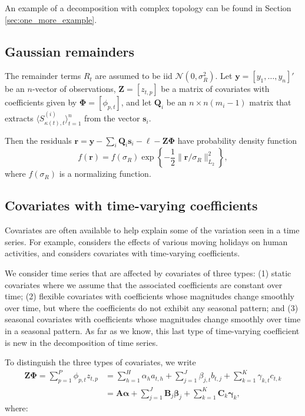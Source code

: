 \documentclass[11pt,a4paper,]{article}
\begin{document}
An example of a decomposition with complex topology can be found in Section \ref{sec:one_more_example}.

\hypertarget{gaussian-remainders}{%
\subsection{Gaussian remainders}\label{gaussian-remainders}}

The remainder terms \(R_{t}\) are assumed to be iid \(\mathcal{N}(0,\sigma_R^2)\).
Let \(\bm{y} = [y_1,\dots,y_n]'\) be an \(n\)-vector of observations, \(\bm{Z}=[z_{t,p}]\) be a matrix of covariates with coefficients given by \(\bm{\Phi} = [\phi_{p,t}]\), and let \(\bm{Q}_i\) be an \(n \times n(m_i-1)\) matrix that extracts \(\langle S^{(i)}_{\kappa(t),t} \rangle_{t=1}^{n}\) from the vector \(\bm{s}_i\).

Then the residuals \(\bm{r} = \bm{y} - \sum_i\bm{Q}_i\bm{s}_i -\bm{\ell} - \bm{Z}\bm{\Phi}\) have probability density function
\[
  f(\bm{r}) = f(\sigma_R)\exp\left\{-\frac{1}{2}\big\|\bm{r}/\sigma_R\big\|_{L_2}^2\right\},
\]
where \(f(\sigma_R)\) is a normalizing function.

\hypertarget{covariates-with-time-varying-coefficients}{%
\subsection{Covariates with time-varying coefficients}\label{covariates-with-time-varying-coefficients}}

Covariates are often available to help explain some of the variation seen in a time series. For example, \textcite{findley2009stock} considers the effects of various moving holidays on human activities, and \textcite{bell2004modeling} considers covariates with time-varying coefficients.

We consider time series that are affected by covariates of three types: (1) static covariates where we assume that the associated coefficients are constant over time; (2) flexible covariates with coefficients whose magnitudes change smoothly over time, but where the coefficients do not exhibit any seasonal pattern; and (3) seasonal covariates with coefficients whose magnitudes change smoothly over time in a seasonal pattern. As far as we know, this last type of time-varying coefficient is new in the decomposition of time series.

To distinguish the three types of covariates, we write
\begin{align*}
  \bm{Z}\bm{\Phi} = \sum_{p=1}^P \phi_{p,t}z_{t,p}
  & =
    \sum_{h=1}^{H} \alpha_{h}{a}_{t,h} +
    \sum_{j=1}^{J} \beta_{j,t}{b}_{t,j} +
    \sum_{k=1}^{K} \gamma_{k,t}{c}_{t,k} \\
  & =
    \bm{A}\bm{\alpha} +
    \sum_{j=1}^{J} \bm{B}_j \bm{\beta}_j +
    \sum_{k=1}^{K} \bm{C}_k \bm{\gamma}_{k},
\end{align*}
where:
\end{document}
